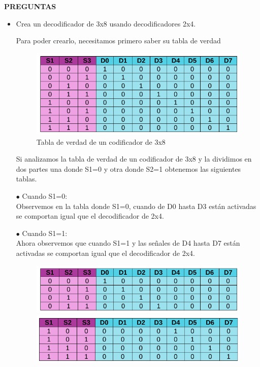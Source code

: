 \documentclass[11pt,letterpaper]{article}
\begin{document}
	\textbf{PREGUNTAS}
		\begin{itemize}
			\item Crea un decodificador de 3x8 usando decodificadores 2x4.
			
			Para poder crearlo, necesitamos primero saber su tabla de verdad 
			\begin{figure}[h!]
				\centering
				\includegraphics[scale=0.5]{3x8.png}
				\caption{Tabla de verdad de un codificador de 3x8}
			\end{figure}
			
			Si analizamos la tabla de verdad de un codificador de 3x8 y la dividimos en dos partes una donde S1=0 y otra donde S2=1 obtenemos las siguientes tablas.
			
			$\bullet$ Cuando S1=0:\\
			Observemos en la tabla donde S1=0, cuando de D0 hasta D3 están activadas se comportan igual que el decodificador de 2x4.
			
			$\bullet$ Cuando S1=1:\\
			Ahora observemos que cuando S1=1 y las señales de D4 hasta D7 están activadas se comportan igual que el decodificador de 2x4.			
			
			\begin{figure}[h!]
				\centering
				\includegraphics[scale=0.35]{uno.png}				\includegraphics[scale=0.35]{dos.png}
				

\end{figure}
\end{itemize}
\end{document}
